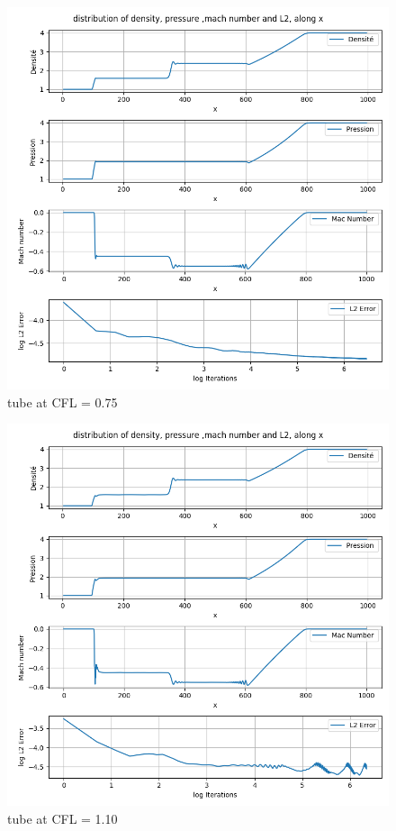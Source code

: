 \documentclass[12pt]{article}
\begin{document}
\begin{figure}[H] %
    \centering
    \includegraphics[width=\textwidth,height=\textheight,keepaspectratio]{PLOTS/Tube_Beam_CFL075.png}
    \caption{tube at CFL = 0.75}
    \label{fig:your_label}
\end{figure}



\begin{figure}[H] %
    \centering
    \includegraphics[width=\textwidth,height=\textheight,keepaspectratio]{PLOTS/Tube_Beam_CFL110.png}
    \caption{tube at CFL = 1.10}
    \label{fig:your_label}
\end{figure}
\end{document}
